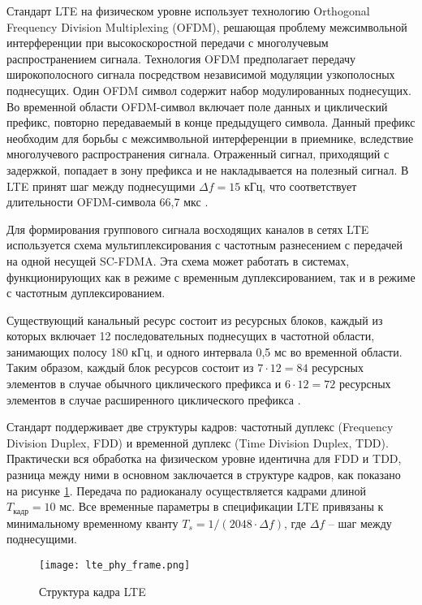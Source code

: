 Стандарт LTE на физическом уровне использует технологию  Orthogonal Frequency Division Multiplexing (OFDM), решающая проблему межсимвольной интерференции при высокоскоростной передачи с многолучевым распространением сигнала. Технология OFDM предполагает передачу широкополосного сигнала посредством независимой модуляции узкополосных поднесущих. Один OFDM символ содержит набор модулированных поднесущих. Во временной области OFDM-символ включает поле данных и циклический префикс, повторно передаваемый в конце предыдущего символа. Данный префикс необходим для борьбы с межсимвольной интерференции в приемнике, вследствие многолучевого распространения сигнала. Отраженный сигнал, приходящий с задержкой, попадает в зону префикса и не накладывается на полезный сигнал. В LTE принят шаг между поднесущими $\Delta f = 15$  кГц, что соответствует длительности OFDM-символа 66,7 мкс \cite{Dahlman2013}.

Для формирования группового сигнала восходящих каналов в сетях LTE используется схема мультиплексирования с частотным разнесением с передачей на одной несущей SC-FDMA. Эта схема может работать в системах, функционирующих как в режиме с временным дуплексированием, так и в режиме с частотным дуплексированием. 

Существующий канальный ресурс состоит из ресурсных блоков, каждый из которых включает 12 последовательных поднесущих в частотной области, занимающих полосу 180 кГц, и одного интервала 0,5 мс во временной области. Таким образом, каждый блок ресурсов состоит из $7 \cdot 12 = 84$ ресурсных элементов в случае обычного циклического префикса и $6 \cdot 12 = 72$ ресурсных элементов в случае расширенного циклического префикса \cite{Dahlman2013}.

Стандарт поддерживает две структуры кадров: частотный дуплекс (Frequency Division Duplex, FDD) и временной дуплекс (Time Division Duplex, TDD). Практически вся обработка на физическом уровне идентична для FDD и TDD, разница между ними в основном заключается в структуре кадров, как показано на рисунке \cref{fig:part1_lte_phy_frame}. Передача по радиоканалу осуществляется кадрами длиной $T_{\text{кадр}} = 10$ мс. Все временные параметры в спецификации LTE привязаны к минимальному временному кванту $T_s = 1 / (2048 \cdot \Delta f)$, где $\Delta f$ -- шаг между поднесущими.

\begin{figure}[h!]
  \centering
   \texttt{[image: lte\_phy\_frame.png]}
\caption{Структура кадра LTE}
\label{fig:part1_lte_phy_frame}
\end{figure}

